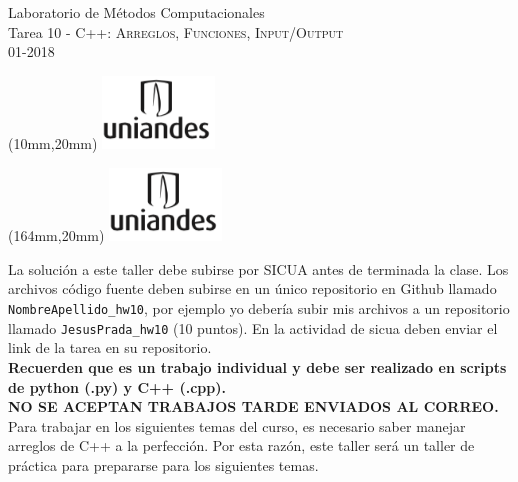 \documentclass[11pt,letterpaper]{exam}
\begin{document}
\begin{center}
{\Large Laboratorio de M\'etodos Computacionales} \\
Tarea 10 - \textsc{C++: Arreglos, Funciones, Input/Output}\\
01-2018\\
\end{center}

\begin{textblock*}{40mm}(10mm,20mm)
  \includegraphics[width=3cm]{logoUniandes}
\end{textblock*}

\begin{textblock*}{40mm}(164mm,20mm)
  \includegraphics[width=3cm]{logoUniandes}
\end{textblock*}

\vspace{0.3cm}

\noindent
La soluci\'on a este taller debe subirse por SICUA antes de terminada la clase.
\noindent
Los archivos c\'odigo fuente deben subirse en un \'unico repositorio en Github llamado
\verb"NombreApellido_hw10", por ejemplo yo deber\'ia subir mis archivos a un repositorio llamado \verb"JesusPrada_hw10" (10 puntos). En la actividad de sicua deben enviar el link de la tarea en su repositorio.\\ 

\textbf{Recuerden que es un trabajo individual y debe ser realizado en scripts de python (.py) y C++ (.cpp).}\\

\textbf{ NO SE ACEPTAN TRABAJOS TARDE ENVIADOS AL CORREO.}\\


Para trabajar en los siguientes temas del curso, es necesario saber manejar arreglos de C++ a la perfecci\'on. Por esta raz\'on, este taller ser\'a un taller de pr\'actica para prepararse para los siguientes temas.\\
\end{document}
